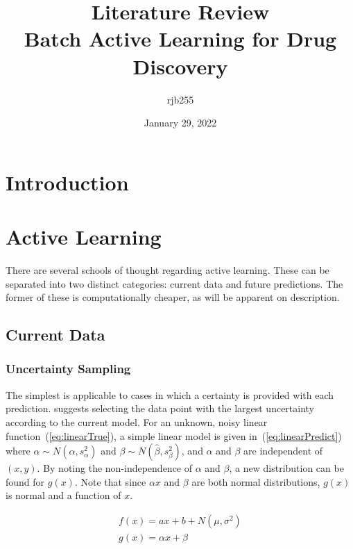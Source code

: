 \documentclass[a4paper, english]{report}
\begin{document}
\title{\Large{\textbf{Literature Review}}\\Batch Active Learning for Drug Discovery}
\author{rjb255}
\date{January 29, 2022}

\maketitle

\begin{abstract}
    \blindtext[1]{}
\end{abstract}

\section{Introduction}
\blindtext[2]{}

\section{Active Learning}\label{ch:Active Learning}
There are several schools of thought regarding active learning. These can be separated into two distinct categories: current data and future predictions. The former of these is computationally cheaper, as will be apparent on description.

\subsection{Current Data}
\subsubsection{Uncertainty Sampling}
The simplest is applicable to cases in which a certainty is provided with each prediction. \textcite{LitRev_2009} suggests selecting the data point with the largest uncertainty according to the current model. For an unknown, noisy linear function~(\ref{eq:linearTrue}), a simple linear model is given in~(\ref{eq:linearPredict}) where $\alpha\sim{}N(\hat{\alpha}, s^2_\alpha)$ and $\beta\sim{}N(\hat{\beta},s^2_\beta)$, and $\alpha$ and $\beta$ are independent of $(x,y)$. By noting the non-independence of $\alpha$ and $\beta$, a new distribution can be found for $g(x)$. Note that since $\alpha{}x$ and $\beta$ are both normal distributions, $g(x)$ is normal and a function of $x$.

\begin{eqnarray}
    \label{eq:linearTrue}
    f(x)=a x+b + N(\mu, \sigma^2)\\
    \label{eq:linearPredict}
    g(x)=\alpha{}x+\beta{}
\end{eqnarray}
\end{document}
